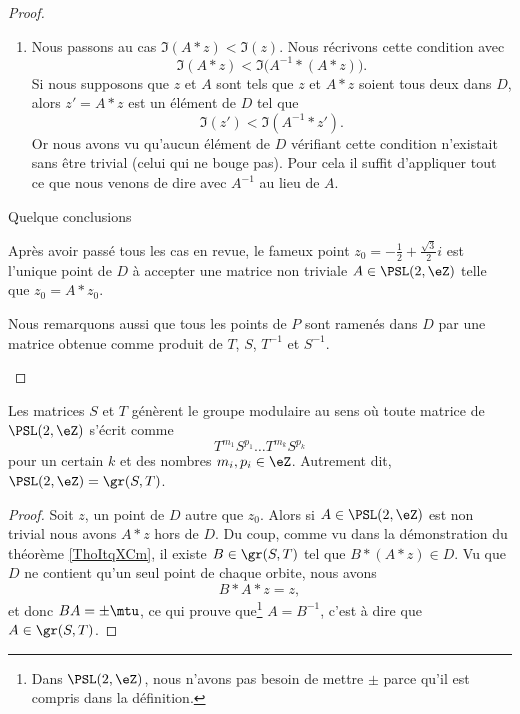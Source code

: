 \begin{proof}
\begin{subproof}
\begin{enumerate}
                    \item
                        Nous passons au cas \( \Im(A*z)<\Im(z)\). Nous récrivons cette condition avec
                        \begin{equation}
                            \Im(A*z)<\Im\big( A^{-1}*(A*z) \big).
                        \end{equation}
                        Si nous supposons que \( z\) et \( A\) sont tels que \( z\) et \( A*z\) soient tous deux dans \( D\), alors \( z'=A*z\) est un élément de \( D\) tel que
                        \begin{equation}
                            \Im(z')<\Im(A^{-1}*z').
                        \end{equation}
                        Or nous avons vu qu'aucun élément de \( D\) vérifiant cette condition n'existait sans être trivial (celui qui ne bouge pas). Pour cela il suffit d'appliquer tout ce que nous venons de dire avec \( A^{-1}\) au lieu de \( A\).
                \end{enumerate}

            \item[Quelque conclusions]

                Après avoir passé tous les cas en revue, le fameux point \( z_0=-\frac{ 1 }{2}+\frac{ \sqrt{3} }{2}i\) est l'unique point de \( D\) à accepter une matrice non triviale \( A\in \PSL(2,\eZ)\) telle que \( z_0=A*z_0\).

                Nous remarquons aussi que tous les points de \( P\) sont ramenés dans \( D\) par une matrice obtenue comme produit de \( T\), \( S\), \( T^{-1}\) et \( S^{-1}\).

    \end{subproof}
\end{proof}

\begin{corollary}    \label{CorJQwgNp}
    Les matrices \( S\) et \( T\) génèrent le groupe modulaire au sens où toute matrice de \( \PSL(2,\eZ)\) s'écrit comme
    \begin{equation}
        T^{m_1}S^{p_1}\ldots T^{m_k}S^{p_k}
    \end{equation}
    pour un certain \( k\) et des nombres \( m_i,p_i\in \eZ\). Autrement dit, \( \PSL(2,\eZ)=\gr(S,T)\).
\end{corollary}

\begin{proof}
    Soit \( z\), un point de \( D\) autre que \( z_0\). Alors si \( A\in \PSL(2,\eZ)\) est non trivial nous avons \( A*z\) hors de \( D\). Du coup, comme vu dans la démonstration du théorème \ref{ThoItqXCm}, il existe \( B\in \gr(S,T)\) tel que \( B*(A*z)\in D\). Vu que \( D\) ne contient qu'un seul point de chaque orbite, nous avons
    \begin{equation}
        B*A*z=z,
    \end{equation}
    et donc \( BA=\pm\mtu\), ce qui prouve que\footnote{Dans \( \PSL(2,\eZ)\), nous n'avons pas besoin de mettre \( \pm\) parce qu'il est compris dans la définition.} \( A=B^{-1}\), c'est à dire que \( A\in\gr(S,T)\).
\end{proof}
